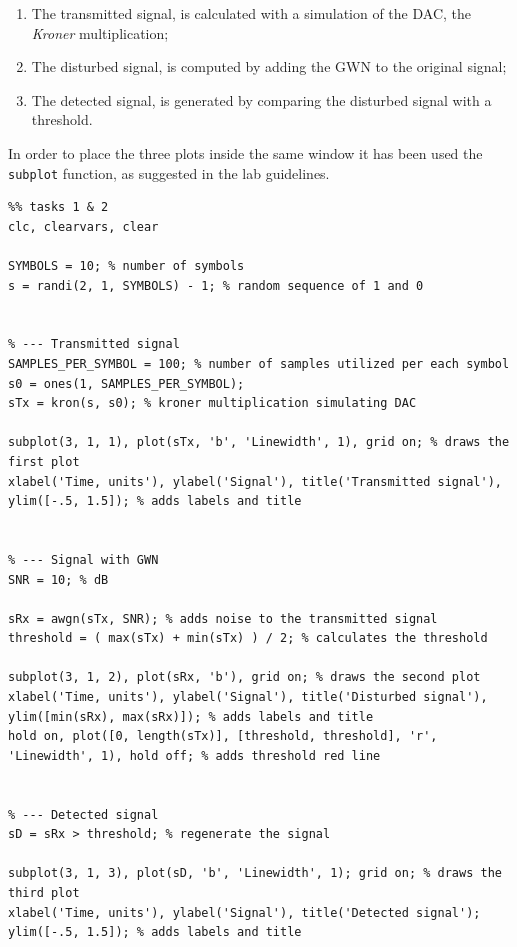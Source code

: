 \vspace{-5px}
\begin{enumerate}
\setlength{\itemsep}{-2px}
    \item The transmitted signal, is calculated with a simulation of the DAC, the \textit{Kroner} multiplication;
    \item The disturbed signal, is computed by adding the GWN to the original signal;
    \item The detected signal, is generated by comparing the disturbed signal with a threshold.
\end{enumerate}\vspace{-5px}
In order to place the three plots inside the same window it has been used the \texttt{subplot} function, as suggested in the lab guidelines.

\begin{lstlisting}
%% tasks 1 & 2
clc, clearvars, clear

SYMBOLS = 10; % number of symbols
s = randi(2, 1, SYMBOLS) - 1; % random sequence of 1 and 0


% --- Transmitted signal
SAMPLES_PER_SYMBOL = 100; % number of samples utilized per each symbol
s0 = ones(1, SAMPLES_PER_SYMBOL); 
sTx = kron(s, s0); % kroner multiplication simulating DAC

subplot(3, 1, 1), plot(sTx, 'b', 'Linewidth', 1), grid on; % draws the first plot
xlabel('Time, units'), ylabel('Signal'), title('Transmitted signal'), ylim([-.5, 1.5]); % adds labels and title


% --- Signal with GWN
SNR = 10; % dB

sRx = awgn(sTx, SNR); % adds noise to the transmitted signal
threshold = ( max(sTx) + min(sTx) ) / 2; % calculates the threshold 

subplot(3, 1, 2), plot(sRx, 'b'), grid on; % draws the second plot
xlabel('Time, units'), ylabel('Signal'), title('Disturbed signal'), ylim([min(sRx), max(sRx)]); % adds labels and title
hold on, plot([0, length(sTx)], [threshold, threshold], 'r', 'Linewidth', 1), hold off; % adds threshold red line


% --- Detected signal
sD = sRx > threshold; % regenerate the signal

subplot(3, 1, 3), plot(sD, 'b', 'Linewidth', 1); grid on; % draws the third plot
xlabel('Time, units'), ylabel('Signal'), title('Detected signal'); ylim([-.5, 1.5]); % adds labels and title
\end{lstlisting}


